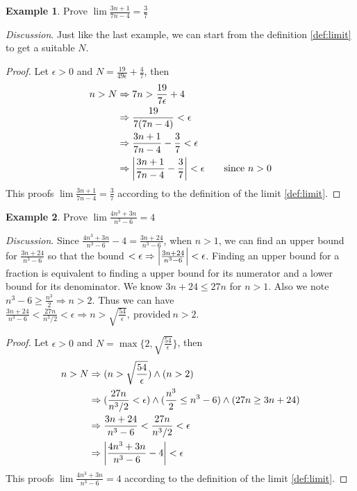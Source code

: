 \documentclass[12pt, lettersize]{book}
\theoremstyle{plain}
\theoremstyle{definition}
\newtheorem*{eg}{Example}
\theoremstyle{remark}
\begin{document}
	\begin{eg}
		Prove $\lim \frac{3n+1}{7n-4}=\frac{3}{7}$
	\end{eg}
	\emph{Discussion}. Just like the last example, we can start from the definition \ref{def:limit} to get a suitable $N$.
	\begin{proof}
		Let $\epsilon>0$ and $N=\frac{19}{49\epsilon}+\frac{4}{7}$, then
		\begin{align*}
			n>N &\Rightarrow 7n>\frac{19}{7\epsilon}+4\\
			&\Rightarrow \frac{19}{7(7n-4)}<\epsilon\\
			&\Rightarrow \frac{3n+1}{7n-4} - \frac{3}{7}<\epsilon\\
			&\Rightarrow \abs{\frac{3n+1}{7n-4} - \frac{3}{7}}<\epsilon\qquad \text{since}\ n>0
		\end{align*}
		This proofs $\lim \frac{3n+1}{7n-4}=\frac{3}{7}$ according to the definition of the limit \ref{def:limit}.
	\end{proof}
	
	\begin{eg}
		Prove $\lim\frac{4n^3+3n}{n^3-6}=4$
	\end{eg}
	\emph{Discussion}. Since $\frac{4n^3+3n}{n^3-6}-4 = \frac{3n+24}{n^3-6}$, when $n>1$, we can find an upper bound for
	$\frac{3n+24}{n^3-6}$ so that the bound $<\epsilon \Rightarrow \abs{\frac{3n+24}{n^3-6}}<\epsilon$. Finding an upper bound for a fraction is equivalent to finding a upper bound for its numerator and a lower bound for its denominator.
	We know $3n+24\leq27n$ for $n>1$. Also we note $n^3-6\geq\frac{n^3}{2} \Rightarrow n>2$. Thus we can have $\frac{3n+24}{n^3-6}<\frac{27n}{n^3/2}<\epsilon \Rightarrow n>\sqrt{\frac{54}{\epsilon}},\ \text{provided}\ n>2$.
	\begin{proof}
		Let $\epsilon>0$ and $N=\max\{2,\sqrt{\frac{54}{\epsilon}}\}$, then
		\begin{align*}
			n>N &\Rightarrow (n>\sqrt{\frac{54}{\epsilon}})\land(n>2)\\
			&\Rightarrow (\frac{27n}{n^3/2}<\epsilon)\land(\frac{n^3}{2}\leq n^3-6)\land(27n\geq3n+24)\\
			&\Rightarrow \frac{3n+24}{n^3-6} < \frac{27n}{n^3/2} < \epsilon\\
			&\Rightarrow \abs{\frac{4n^3+3n}{n^3-6}-4} < \epsilon
		\end{align*}
		This proofs $\lim\frac{4n^3+3n}{n^3-6}=4$ according to the definition of the limit \ref{def:limit}.
	\end{proof}
	
\end{document}
